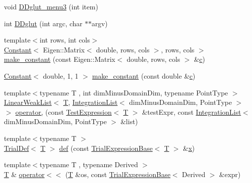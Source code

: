 \begin{DoxyCompactItemize}
\item 
void \hyperlink{namespacemodel_a42cabb8466e6cfe235835ba6e3c3e847}{D\+Dglut\+\_\+menu3} (int item)
\item 
int \hyperlink{namespacemodel_ae2240c8a687f0488fcf19c070428b623}{D\+Dglut} (int argc, char $\ast$$\ast$argv)
\item 
{\footnotesize template$<$int rows, int cols$>$ }\\\hyperlink{structmodel_1_1_constant}{Constant}$<$ Eigen\+::\+Matrix$<$ double, rows, cols $>$, rows, cols $>$ \hyperlink{namespacemodel_ae056ea8a20e93cd671ab99ea6c8ef348}{make\+\_\+constant} (const Eigen\+::\+Matrix$<$ double, rows, cols $>$ \&\hyperlink{plot_cells_8m_aa49cfdd4fa4d74d71f78a001a1b635d0}{c})
\item 
\hyperlink{structmodel_1_1_constant}{Constant}$<$ double, 1, 1 $>$ \hyperlink{namespacemodel_ad3858486de62d9ab7d9b1c22dd5182bf}{make\+\_\+constant} (const double \&\hyperlink{plot_cells_8m_aa49cfdd4fa4d74d71f78a001a1b635d0}{c})
\item 
{\footnotesize template$<$typename T , int dim\+Minus\+Domain\+Dim, typename Point\+Type $>$ }\\\hyperlink{classmodel_1_1_linear_weak_list}{Linear\+Weak\+List}$<$ \hyperlink{_spline_node_base__corder1_8h_a82692d3a5502b91460591f1d5504314a}{T}, \hyperlink{structmodel_1_1_integration_list}{Integration\+List}$<$ dim\+Minus\+Domain\+Dim, Point\+Type $>$ $>$ \hyperlink{namespacemodel_a8df9f63a6ed91768515f1a0adb1dd8f4}{operator,} (const \hyperlink{structmodel_1_1_test_expression}{Test\+Expression}$<$ \hyperlink{_spline_node_base__corder1_8h_a82692d3a5502b91460591f1d5504314a}{T} $>$ \&test\+Expr, const \hyperlink{structmodel_1_1_integration_list}{Integration\+List}$<$ dim\+Minus\+Domain\+Dim, Point\+Type $>$ \&list)
\item 
{\footnotesize template$<$typename T $>$ }\\\hyperlink{classmodel_1_1_trial_def}{Trial\+Def}$<$ \hyperlink{_spline_node_base__corder1_8h_a82692d3a5502b91460591f1d5504314a}{T} $>$ \hyperlink{namespacemodel_aec5b5b3b23027eba40ce72668f1a8ee9}{def} (const \hyperlink{structmodel_1_1_trial_expression_base}{Trial\+Expression\+Base}$<$ \hyperlink{_spline_node_base__corder1_8h_a82692d3a5502b91460591f1d5504314a}{T} $>$ \&\hyperlink{generate_s_t_lcyl_8m_a9336ebf25087d91c818ee6e9ec29f8c1}{x})
\item 
{\footnotesize template$<$typename T , typename Derived $>$ }\\\hyperlink{_spline_node_base__corder1_8h_a82692d3a5502b91460591f1d5504314a}{T} \& \hyperlink{namespacemodel_aebcfc0576aa4c8b34a16a6de4399b336}{operator$<$$<$} (\hyperlink{_spline_node_base__corder1_8h_a82692d3a5502b91460591f1d5504314a}{T} \&os, const \hyperlink{structmodel_1_1_trial_expression_base}{Trial\+Expression\+Base}$<$ Derived $>$ \&expr)
$$
\end{DoxyCompactItemize}
